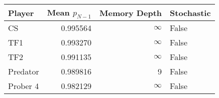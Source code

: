 \begin{tabular}{lrrl}
\toprule
   Player &  Mean $p_{N-1}$ &  Memory Depth & Stochastic \\
\midrule
       CS &        0.995564 &            \(\infty\) &      False \\
      TF1 &        0.993270 &            \(\infty\) &      False \\
      TF2 &        0.991135 &            \(\infty\) &      False \\
 Predator &        0.989816 &             9 &      False \\
 Prober 4 &        0.982129 &            \(\infty\) &      False \\
\bottomrule
\end{tabular}
